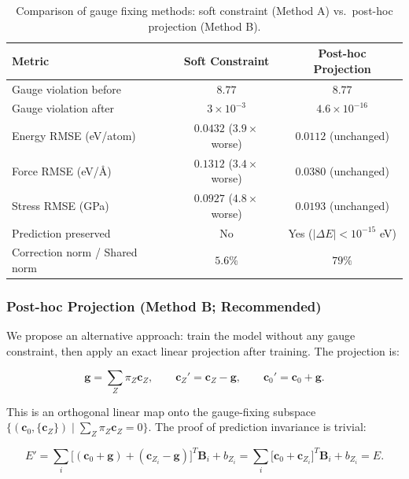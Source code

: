 \documentclass[twoside,prb,aps,floatfix,superscriptaddress,longbibliography]{revtex4-2}
\begin{document}
\begin{table}[t]
\caption{Comparison of gauge fixing methods: soft constraint (Method A) vs.\ post-hoc projection (Method B).}
\label{tab:gauge_methods}
\begin{ruledtabular}
\begin{tabular}{lcc}
\toprule
Metric & Soft Constraint & Post-hoc Projection \\
\midrule
Gauge violation before & $8.77$ & $8.77$ \\
Gauge violation after & $3\times10^{-3}$ & $4.6\times10^{-16}$ \\
Energy RMSE (eV/atom) & $0.0432$ ($3.9\times$ worse) & $0.0112$ (unchanged) \\
Force RMSE (eV/{\AA}) & $0.1312$ ($3.4\times$ worse) & $0.0380$ (unchanged) \\
Stress RMSE (GPa) & $0.0927$ ($4.8\times$ worse) & $0.0193$ (unchanged) \\
Prediction preserved & No & Yes ($|\Delta E| < 10^{-15}$ eV) \\
Correction norm / Shared norm & $5.6\%$ & $79\%$ \\
\bottomrule
\end{tabular}
\end{ruledtabular}
\end{table}

\subsubsection{Post-hoc Projection (Method B; Recommended)}

We propose an alternative approach: train the model without any gauge constraint, then apply an exact linear projection after training. The projection is:

\begin{equation}
\mathbf{g} = \sum_Z \pi_Z \mathbf{c}_Z, \qquad
\mathbf{c}_Z' = \mathbf{c}_Z - \mathbf{g}, \qquad
\mathbf{c}_0' = \mathbf{c}_0 + \mathbf{g}.
\label{eq:posthoc_projection}
\end{equation}

This is an orthogonal linear map onto the gauge-fixing subspace $\{(\mathbf{c}_0, \{\mathbf{c}_Z\}) \mid \sum_Z \pi_Z \mathbf{c}_Z = 0\}$. The proof of prediction invariance is trivial:

\begin{equation}
E' = \sum_i \big[ (\mathbf{c}_0 + \mathbf{g}) + (\mathbf{c}_{Z_i} - \mathbf{g}) \big]^T \mathbf{B}_i + b_{Z_i}
    = \sum_i \big[ \mathbf{c}_0 + \mathbf{c}_{Z_i} \big]^T \mathbf{B}_i + b_{Z_i}
    = E.
\label{eq:projection_invariance}
\end{equation}
\end{document}
